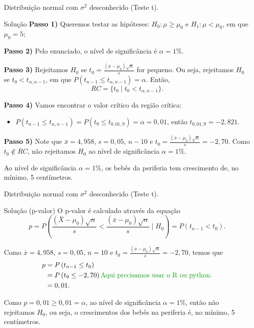 \documentclass[8pt]{beamer}
\begin{document}
\begin{frame}{Distribuição normal com $\sigma^2$ desconhecido (Teste t).}

\large

\begin{block}{Solução}
	\textbf{Passo 1)} Queremos testar as hipóteses: $H_0: \mu \geq \mu_0$ e $H_1: \mu < \mu_0$, em que $\mu_0=5$;
	
	\textbf{Passo 2)} Pelo enunciado, o nível de significância é $\alpha=1\%$.
	
	\textbf{Passo 3)} Rejeitamos $H_0$ se $t_0= \frac{(\bar{x} - \mu_0)\sqrt{n}}{s}$ for pequeno. Ou seja, rejeitamos $H_0$ se $t_0 < t_{\alpha, n-1}$, em que $P\left( t_{n-1} \leq t_{\alpha, n-1} \right)=\alpha$. Então,
	$$RC = \{ t_0 \mid t_0 < t_{\alpha, n-1} \}.$$
	
	\textbf{Passo 4)} Vamos encontrar o valor crítico da região crítica:
	\begin{itemize}
		\item $P\left(t_{n-1} \leq t_{\alpha, n-1}\right) = P\left(t_{9} \leq t_{0,01, 9}\right)= \alpha = 0,01$, então $t_{0,01, 9} = -2,821$.
	\end{itemize}

	\textbf{Passo 5)} Note que $\bar{x}= 4,958$, $s=0,05$, $n-10$ e $t_0 = \frac{(\bar{x}- \mu_0)\sqrt{n}}{s} = -2,70$. Como $t_0 \not\in RC$, não rejeitamos $H_0$ ao nível de significância $\alpha=1\%$.
	
	Ao nível de significância $\alpha=1\%$, os bebês da periferia tem crescimento de, no mínimo, 5 centímetros.
\end{block}

\normalsize

\end{frame}

\begin{frame}{Distribuição normal com $\sigma^2$ desconhecido (Teste t).}

\large

\begin{block}{Solução (p-valor)}
	O p-valor é calculado através da equação
	$$p = P\left( \frac{(\bar{X} - \mu_0)\sqrt{n}}{s} < \frac{(\bar{x} - \mu_0)\sqrt{n}}{s} \mid H_0 \right) = P\left( t_{n-1} < t_0 \right).$$
	
	Como $\bar{x} = 4,958$, $s=0,05$, $n=10$ e $t_0 = \frac{(\bar{x} - \mu_0)\sqrt{n}}{s} = -2,70$, temos que
	\begin{align*}
		p &= P \left( t_{n-1} \leq t_0\right)\\
		&= P \left( t_9 \leq -2,70\right) \mbox{\textcolor{important}{Aqui precisamos usar o R ou python.}}\\
		&= 0,01.
	\end{align*}
	
	Como $p=0,01 \geq 0,01 = \alpha$, ao nível de significância $\alpha=1\%$, então não rejeitamos $H_0$, ou seja, o crescimentos dos bebês na periferia é, no mínimo, 5 centímetros.		
\end{block}

\normalsize

\end{frame}
\end{document}
